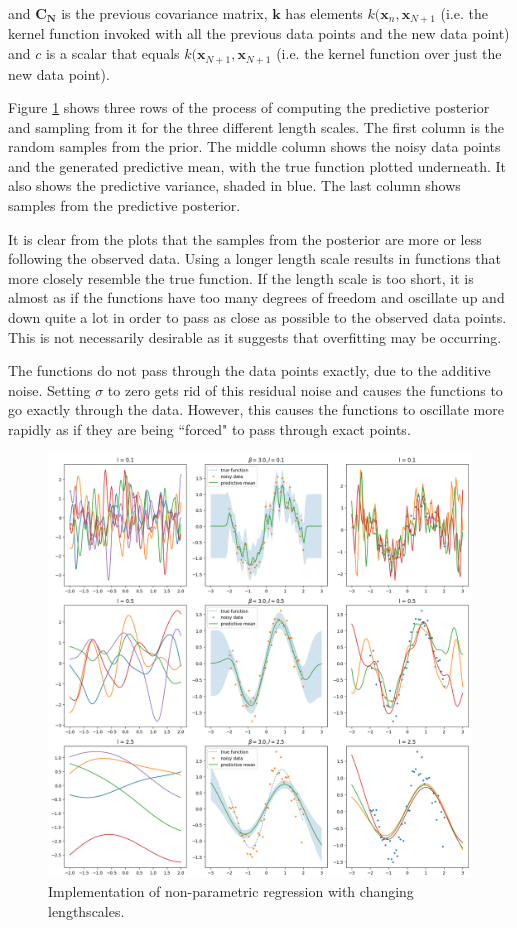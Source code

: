 \documentclass[10pt, a4paper, twocolumn]{article} %
\begin{document}
and $\mathbf{C_N}$ is the previous covariance matrix, $\mathbf{k}$ has elements $k(\mathbf{x}_n, \mathbf{x}_{N+1}$ (i.e. the kernel function invoked with all the previous data points and the new data point) and $c$ is a scalar that equals $k(\mathbf{x}_{N+1}, \mathbf{x}_{N+1}$ (i.e. the kernel function over just the new data point).

Figure \ref{fig:q14} shows three rows of the process of computing the predictive posterior and sampling from it for the three different length scales. The first column is the random samples from the prior. The middle column shows the noisy data points and the generated predictive mean, with the true function plotted underneath. It also shows the predictive variance, shaded in blue. The last column shows samples from the predictive posterior.

It is clear from the plots that the samples from the posterior are more or less following the observed data. Using a longer length scale results in functions that more closely resemble the true function. If the length scale is too short, it is almost as if the functions have too many degrees of freedom and oscillate up and down quite a lot in order to pass as close as possible to the observed data points. This is not necessarily desirable as it suggests that overfitting may be occurring.

The functions do not pass through the data points exactly, due to the additive noise. Setting $\sigma$ to zero gets rid of this residual noise and causes the functions to go exactly through the data. However, this causes the functions to oscillate more rapidly as if they are being ``forced" to pass through exact points.

\begin{figure}[!htb]
\centerline{\includegraphics[width=\linewidth]{q14.png}}
\caption{Implementation of non-parametric regression with changing lengthscales. }
\label{fig:q14}
\end{figure}
\end{document}
